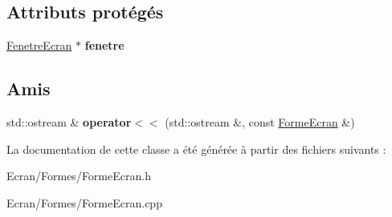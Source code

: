 \subsection*{Attributs protégés}
\begin{DoxyCompactItemize}
\item 
\mbox{\label{class_forme_ecran_a65ab2b50df82aa93e629bf7df1a5ff09}} 
\mbox{\hyperlink{class_fenetre_ecran}{Fenetre\+Ecran}} $\ast$ {\bfseries fenetre}
\end{DoxyCompactItemize}
\subsection*{Amis}
\begin{DoxyCompactItemize}
\item 
\mbox{\label{class_forme_ecran_ace3406dee04b0ad37769553ffd4f97a5}} 
std\+::ostream \& {\bfseries operator$<$$<$} (std\+::ostream \&, const \mbox{\hyperlink{class_forme_ecran}{Forme\+Ecran}} \&)
\end{DoxyCompactItemize}


La documentation de cette classe a été générée à partir des fichiers suivants \+:\begin{DoxyCompactItemize}
\item 
Ecran/\+Formes/Forme\+Ecran.\+h\item 
Ecran/\+Formes/Forme\+Ecran.\+cpp\end{DoxyCompactItemize}
